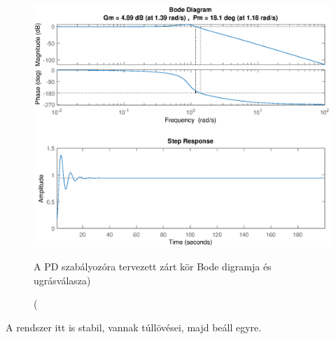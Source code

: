 \documentclass[12pt]{article}
\begin{document}
\begin{figure}[H]
\centering
\includegraphics[scale=.70]{WCLOSED_PD}
\caption(A PD szabályozóra tervezett zárt kör Bode digramja és ugrásválasza)
\end{figure}
A rendszer itt is stabil, vannak túllövései, majd beáll egyre.
\end{document}
